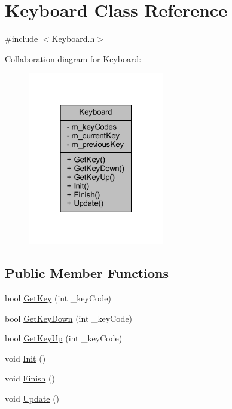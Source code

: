 \hypertarget{class_keyboard}{}\section{Keyboard Class Reference}
\label{class_keyboard}


{\ttfamily \#include $<$Keyboard.\+h$>$}



Collaboration diagram for Keyboard\+:\nopagebreak
\begin{figure}[H]
\begin{center}
\leavevmode
\includegraphics[width=169pt]{class_keyboard__coll__graph}
\end{center}
\end{figure}
\subsection*{Public Member Functions}
\begin{DoxyCompactItemize}
\item 
bool \mbox{\hyperlink{class_keyboard_a96e37d5e981c0a27e5839de9de9f91ee}{Get\+Key}} (int \+\_\+key\+Code)
\item 
bool \mbox{\hyperlink{class_keyboard_a1a10de35e37fa9a3300f2a71ef67e677}{Get\+Key\+Down}} (int \+\_\+key\+Code)
\item 
bool \mbox{\hyperlink{class_keyboard_a17da03653e9ea94b0175943fc317b56b}{Get\+Key\+Up}} (int \+\_\+key\+Code)
\item 
void \mbox{\hyperlink{class_keyboard_aa2ee7cfb4ef44e708877653a92af6f29}{Init}} ()
\item 
void \mbox{\hyperlink{class_keyboard_a817f09683a812ca7d2c737276e2b5dfa}{Finish}} ()
\item 
void \mbox{\hyperlink{class_keyboard_a071313d0ae6538e9307ff6a059aa9197}{Update}} ()
\end{DoxyCompactItemize}
